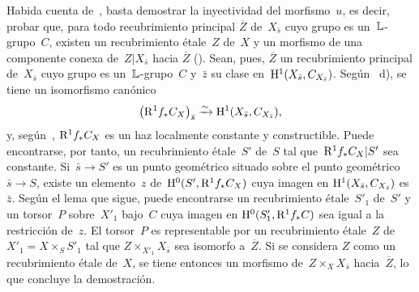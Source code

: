 Habida cuenta de~, basta demostrar la inyectividad del
morfismo~$u$, es decir, probar que, para todo recubrimiento principal
$\overline{Z}$ de~$X_{\bar{s}}$
cuyo grupo es un~$\mathbb L$-grupo~$C$, existen un recubrimiento étale~$Z$ de~$X$
y un morfismo de una componente conexa de~$Z|X_{\bar{s}}$ hacia
$\overline{Z}$ (). Sean, pues, $\overline{Z}$ un recubrimiento
principal de~$X_{\bar{s}}$ cuyo grupo es un~$\mathbb L$-grupo~$C$ y~$\bar{z}$ su
clase en~$\mathrm H^1(X_{\bar{s}},C_{X_{\bar{s}}})$. Según ~d), se
tiene un isomorfismo canónico
$$
\left(\mathrm{R}^1f_*C_X\right)_{\bar{s}}\xrightarrow{\sim}\mathrm H^1(X_{\bar{s}},C_{X_{\bar{s}}}),
$$
y, según~, $\mathrm{R}^1f_*C_X$ es un haz localmente constante y
constructible. Puede encontrarse, por tanto, un recubrimiento étale~$S'$ de~$S$
tal que~$\mathrm{R}^1f_*C_X|S'$ sea constante. Si~$\bar{s}\to S'$ es un punto
geométrico situado sobre el punto geométrico~$\bar{s}\to S$, existe un
elemento~$z$ de~$\mathrm H^0(S', \mathrm{R}^1f_*C_X)$ cuya imagen en
$\mathrm H^1(X_{\bar{s}},C_{X_{\bar{s}}})$ es~$\bar{z}$. Según el lema
 que sigue, puede encontrarse un recubrimiento étale~$S'_1$
de~$S'$ y un torsor~$P$ sobre~$X'_1$ bajo~$C$ cuya imagen en
$\mathrm H^0(S'_1,\mathrm{R}^1f_*C)$ sea igual a la restricción de~$z$. El torsor~$P$ es
representable por un recubrimiento étale~$Z$ de~$X'_1=X\times_SS'_1$ tal que
$Z\times_{X'_1}X_{\bar{s}}$ sea isomorfo a~$\overline{Z}$. Si se considera
$Z$ como un recubrimiento étale de~$X$, se tiene entonces un morfismo
de~$Z\times_XX_{\bar{s}}$ hacia~$\overline{Z}$, lo que concluye la
demostración.
